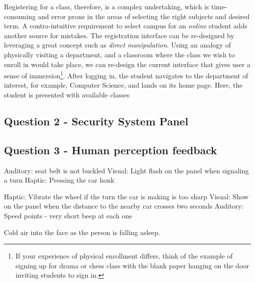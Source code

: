 \documentclass[12pt,letterpaper]{article}
\begin{document}
Registering for a class, therefore, is a complex undertaking, which is time-consuming and error prone in the areas of selecting the right subjects and desired term. A contra-intuitive requirement to select campus for an \textit{online} student adds another source for mistakes.
The registration interface can be re-designed by leveraging a great concept such as \textit{direct manipulation}. Using an analogy of physically visiting a department, and a classroom where the class we wish to enroll in would take place, we can re-design the current interface that gives user a sense of immersion\footnote{If your experience of physical enrollment differs, think of the example of signing up for drama or chess class with the blank paper hanging on the door inviting students to sign in.}. After logging in, the student navigates to the department of interest, for example, Computer Science, and lands on its home page. Here, the student is presented with available classes  



\subsection*{Question 2 - Security System Panel}

\subsection*{Question 3 - Human perception feedback}

Auditory: seat belt is not buckled  
Visual: Light flash on the panel when signaling a turn 
Haptic: Pressing the car honk

Haptic: Vibrate the wheel if the turn the car is making is too sharp
Visual: Show on the panel when the distance to the nearby car crosses two seconds
Auditory: Speed points - very short beep at each one

Cold air into the face as the person is falling asleep.

 

\end{document}
